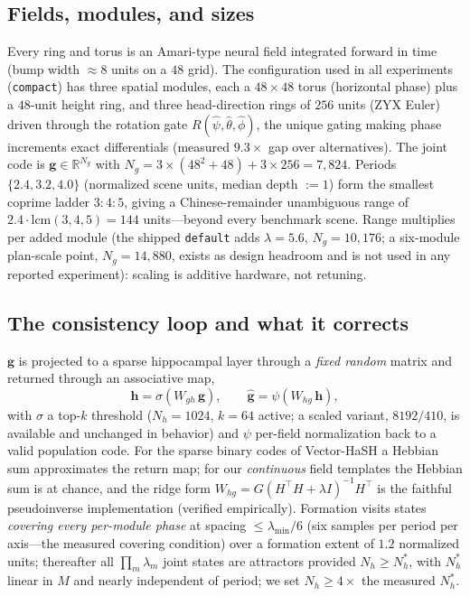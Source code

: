 \subsection{Fields, modules, and sizes}
Every ring and torus is an Amari-type neural field integrated forward in
time (bump width ${\approx}8$ units on a $48$ grid). The configuration
used in all experiments (\texttt{compact}) has three spatial modules,
each a $48{\times}48$ torus (horizontal phase) plus a $48$-unit height
ring, and three head-direction rings of $256$ units (ZYX Euler) driven
through the rotation gate $R(\hat\psi,\hat\theta,\hat\phi)$, the unique
gating making phase increments exact differentials (measured $9.3\times$
gap over alternatives). The joint code is
$\mathbf g\in\mathbb R^{N_g}$ with
$N_g = 3\times(48^2{+}48) + 3\times256 = 7{,}824$. Periods
$\{2.4,3.2,4.0\}$ (normalized scene units, median depth ${:=}1$) form the
smallest coprime ladder $3{:}4{:}5$, giving a Chinese-remainder
unambiguous range of $2.4\cdot\mathrm{lcm}(3,4,5)=144$ units---beyond
every benchmark scene. Range multiplies per added module (the shipped
\texttt{default} adds $\lambda{=}5.6$, $N_g{=}10{,}176$; a six-module
plan-scale point, $N_g{=}14{,}880$, exists as design headroom and is not
used in any reported experiment): scaling is additive hardware, not
retuning.

\subsection{The consistency loop and what it corrects}
$\mathbf g$ is projected to a sparse hippocampal layer through a
\emph{fixed random} matrix and returned through an associative map,
\begin{equation}
\mathbf h=\sigma(W_{gh}\,\mathbf g),\qquad
\hat{\mathbf g}=\psi(W_{hg}\,\mathbf h),
\end{equation}
with $\sigma$ a top-$k$ threshold ($N_h{=}1024$, $k{=}64$ active; a scaled variant, $8192/410$, is available and unchanged in behavior) and $\psi$ per-field
normalization back to a valid population code. For the sparse binary
codes of Vector-HaSH a Hebbian sum approximates the return map; for our
\emph{continuous} field templates the Hebbian sum is at chance, and the
ridge form $W_{hg}=G(H^{\!\top}H+\lambda I)^{-1}H^{\!\top}$ is the
faithful pseudoinverse implementation (verified empirically). Formation
visits states \emph{covering every per-module phase} at spacing
$\le\lambda_{\min}/6$ (six samples per period per axis---the measured
covering condition) over a formation extent of $1.2$ normalized units;
thereafter all $\prod_m\lambda_m$ joint states are attractors provided
$N_h\ge N_h^{\!*}$, with $N_h^{\!*}$ linear in $M$ and nearly independent
of period; we set $N_h\ge4\times$ the measured $N_h^{\!*}$.

